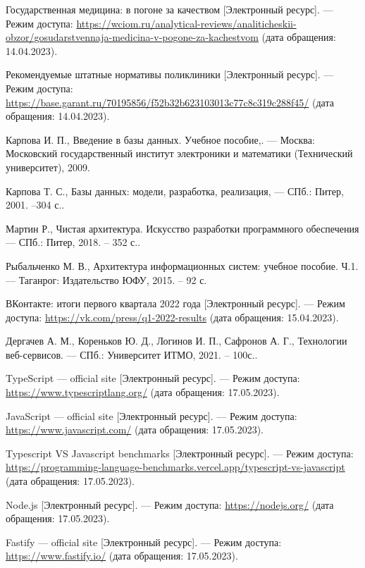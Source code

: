 \begin{thebibliography}{}
	Государственная медицина: в погоне за качеством [Электронный ресурс]. --- Режим доступа: \url{https://wciom.ru/analytical-reviews/analiticheskii-obzor/gosudarstvennaja-medicina-v-pogone-za-kachestvom} (дата обращения: 14.04.2023).
	
	Рекомендуемые штатные нормативы поликлиники [Электронный ресурс]. --- Режим доступа: \url{https://base.garant.ru/70195856/f52b32b623103013c77c8c319c288f45/} (дата обращения: 14.04.2023).
	
	Карпова И. П., Введение в базы данных. Учебное пособие,. --- Москва: Московский государственный институт электроники и математики (Технический университет), 2009.
	
	Карпова Т. С., Базы данных: модели, разработка, реализация, --- СПб.: Питер, 2001. --304 с..
	
	Мартин Р., Чистая архитектура. Искусство разработки программного обеспечения --- СПб.: Питер, 2018. -- 352 с..
	
	Рыбальченко М. В., Архитектура информационных систем: учебное пособие. Ч.1. --- Таганрог: Издательство ЮФУ, 2015. -- 92 с.
	
	ВКонтакте: итоги первого квартала 2022 года [Электронный ресурс]. --- Режим доступа: \url{https://vk.com/press/q1-2022-results} (дата обращения: 15.04.2023).
	
	Дергачев А. М., Кореньков Ю. Д., Логинов И. П., Сафронов А. Г., Технологии веб-сервисов. --- СПб.: Университет ИТМО, 2021. -- 100с..
	
	TypeScript --- official site [Электронный ресурс]. --- Режим доступа: \url{https://www.typescriptlang.org/} (дата обращения: 17.05.2023).

	JavaScript --- official site [Электронный ресурс]. --- Режим доступа: \url{https://www.javascript.com/} (дата обращения: 17.05.2023).
	
	Typescript VS Javascript benchmarks [Электронный ресурс]. --- Режим доступа: \url{https://programming-language-benchmarks.vercel.app/typescript-vs-javascript} (дата обращения: 17.05.2023).

	 Node.js [Электронный ресурс]. --- Режим доступа: \url{https://nodejs.org/} (дата обращения: 17.05.2023).
	
	Fastify --- official site [Электронный ресурс]. --- Режим доступа: \url{https://www.fastify.io/} (дата обращения: 17.05.2023).
	

\end{thebibliography}
